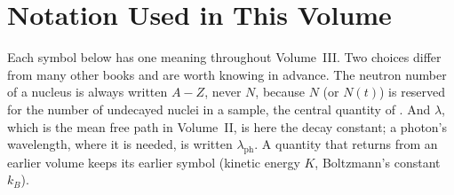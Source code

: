 \section*{Notation Used in This Volume}

Each symbol below has one meaning throughout Volume~III. Two choices differ from many other books and
are worth knowing in advance. The neutron number of a nucleus is always written $A-Z$, never $N$,
because $N$ (or $N(t)$) is reserved for the number of undecayed nuclei in a sample, the central quantity
of . And $\lambda$, which is the mean free path in Volume~II, is here the decay
constant; a photon's wavelength, where it is needed, is written $\lambda_{\text{ph}}$. A quantity that
returns from an earlier volume keeps its earlier symbol (kinetic energy $K$, Boltzmann's constant $k_B$).

